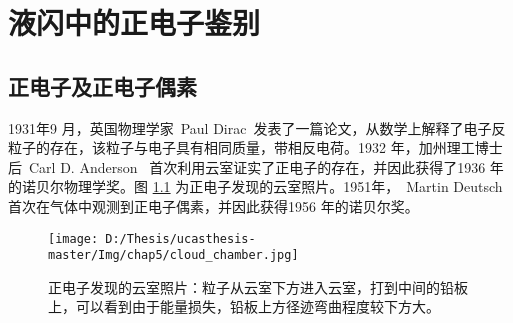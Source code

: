 
\chapter{液闪中的正电子鉴别}
\label{chap:chap5}
\section{正电子及正电子偶素}
1931年9 月，英国物理学家~Paul Dirac~发表了一篇论文，从数学上解释了电子反粒子的存在，该粒子与电子具有相同质量，带相反电荷。1932 年，加州理工博士后~Carl D. Anderson~ 首次利用云室证实了正电子的存在，并因此获得了1936 年的诺贝尔物理学奖。图
\ref{fig:p51} 为正电子发现的云室照片。1951年，~Martin Deutsch~ 首次在气体中观测到正电子偶素，并因此获得1956 年的诺贝尔奖。
\begin{figure}[!htb]
  \centering
  \texttt{[image: D:/Thesis/ucasthesis-master/Img/chap5/cloud\_chamber.jpg]}
  \caption{正电子发现的云室照片：粒子从云室下方进入云室，打到中间的铅板上，可以看到由于能量损失，铅板上方径迹弯曲程度较下方大。}
  \label{fig:p51}
\end{figure}

